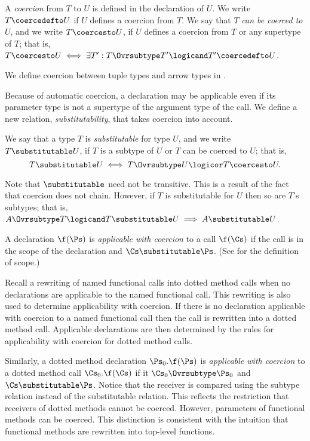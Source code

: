 A \emph{coercion} from $T$ to $U$ is defined in the declaration of $U$.
We write $T \coercedefto U$ if $U$ defines a coercion from $T$.
We say that $T$ \emph{can be coerced to} $U$, and we write $T \coercesto
U$, if $U$ defines a coercion from $T$ or any supertype of $T$; that
is, $T \coercesto U \iff \exists T': T \Ovrsubtype T' \logicand T'
\coercedefto U$.

We define coercion between tuple types and arrow types in
.

Because of automatic coercion, a declaration may be applicable even if
its parameter type is not a supertype of the argument type of the
call.  We define a new relation, \emph{substitutability}, that takes
coercion into account.

We say that a type $T$ is \emph{substitutable} for type $U$, and we
write $T \substitutable U$, if $T$ is a subtype of $U$ or $T$ can be
coerced to $U$; that is,
\[
T \substitutable U \iff T \Ovrsubtype U \logicor T \coercesto U.
\]

Note that $\substitutable$ need not be transitive.  This is a result
of the fact that coercion does not chain.
However, if $T$ is substitutable for $U$ then so are $T$'s subtypes;
that is, $A \Ovrsubtype T \logicand T \substitutable U \implies A
\substitutable U$.

A declaration $\f(\Ps)$ is \emph{applicable with coercion} to a
call $\f(\Cs)$ if the call is in the scope of the declaration and
$\Cs \substitutable \Ps$.
(See  for the definition of scope.)

Recall a rewriting of
named functional calls into dotted method calls when no declarations
are applicable to the named functional call.  This rewriting is also
used to determine applicability with coercion.  If there is no
declaration applicable with coercion to a named functional call then
the call is rewritten into a dotted method call.
Applicable declarations are then
determined by the rules for applicability with coercion for dotted
method calls.

Similarly, a dotted method declaration $\Ps_0.\f(\Ps)$ is
\emph{applicable with coercion} to a dotted method call
$\Cs_0.\f(\Cs)$ if it $\Cs_0 \Ovrsubtype \Ps_0$ and $\Cs
\substitutable \Ps$.  Notice that the receiver is compared using the
subtype relation instead of the substitutable relation.  This reflects
the restriction that receivers of dotted methods cannot be
coerced.  However,  parameters of functional methods can be
coerced.  This distinction is consistent with the intuition that
functional methods are rewritten into top-level functions.

